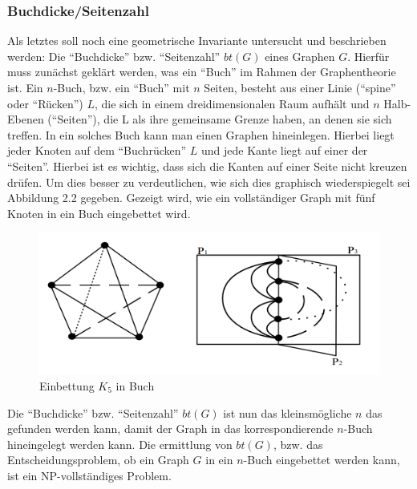 \documentclass[a4paper,12pt,ngerman,chapterprefix=false,listof=totoc,bibliography=totoc]{scrreprt}
\begin{document}
{\subsubsection*{Buchdicke/Seitenzahl}
{
Als letztes soll noch eine geometrische Invariante untersucht und beschrieben werden: Die "`Buchdicke"' bzw. "`Seitenzahl"' \(bt(G)\) eines Graphen \(G\). Hierfür muss zunächst geklärt werden, was ein "`Buch"' im Rahmen der Graphentheorie ist. Ein \(n\)-Buch, bzw. ein "`Buch"' mit \(n\) Seiten, besteht aus einer Linie ("`spine"' oder "`Rücken"') \(L\), die sich in einem dreidimensionalen Raum aufhält und \(n\) Halb-Ebenen ("`Seiten"'), die L als ihre gemeinsame Grenze haben, an denen sie sich treffen. In ein solches Buch kann man einen Graphen hineinlegen. Hierbei liegt jeder Knoten auf dem "`Buchrücken"' \(L\) und jede Kante liegt auf einer der "`Seiten"'. Hierbei ist es wichtig, dass sich die Kanten auf einer Seite nicht kreuzen drüfen. Um dies besser zu verdeutlichen, wie sich dies graphisch wiederspiegelt sei Abbildung 2.2 gegeben. Gezeigt wird, wie ein vollständiger Graph mit fünf Knoten in ein Buch eingebettet wird.
\begin{figure}[ht!]
	\centering
	\includegraphics[scale=0.4]{Abbildungen/graph_book.png}
	\caption[Einbettung \(K_5\) in Buch \cite{blankenship_book_2003}]{Einbettung \(K_5\) in Buch \cite{blankenship_book_2003}}
\end{figure}
Die "`Buchdicke"' bzw. "`Seitenzahl"' \(bt(G)\) ist nun das kleinsmögliche \(n\) das gefunden werden kann, damit der Graph in das korrespondierende \(n\)-Buch hineingelegt werden kann. \cite{bernhart_book_1979} Die ermittlung von \(bt(G)\), bzw. das Entscheidungsproblem, ob ein Graph \(G\) in ein \(n\)-Buch eingebettet werden kann, ist ein NP-vollständiges Problem. \cite{chung_embedding_1987}

}}
\end{document}
